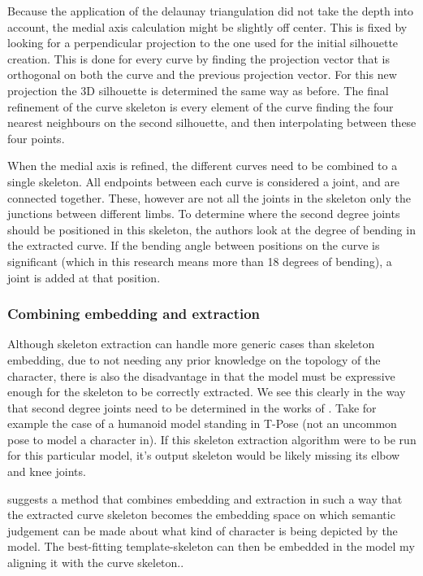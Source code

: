 \documentclass{article}
\begin{document}
Because the application of the delaunay triangulation did not take the depth
into account, the medial axis calculation might be slightly off center. This is fixed
by looking for a perpendicular projection to the one used for the initial
silhouette creation. This is done for every curve by finding the projection
vector that is orthogonal on both the curve and the previous projection vector.
For this new projection the 3D silhouette is determined the same way as before.
The final refinement of the curve skeleton is  every element of the curve
finding the four nearest neighbours on the second silhouette, and then
interpolating between these four points.

When the medial axis is refined, the different curves need to be combined to a
single skeleton. All endpoints between each curve is considered a joint, and are
connected together. These, however are not all the joints in the skeleton only
the junctions between different limbs. To determine where the second degree
joints should be positioned in this skeleton, the authors look at the degree of
bending in the extracted curve. If the bending angle between positions on the curve is 
significant (which in this research means more than 18 degrees of bending), a
joint is added at that position.

\subsubsection{Combining embedding and extraction} Although skeleton extraction
can handle more generic cases than skeleton embedding, due to not needing any
prior knowledge on the topology of the character, there is also the
disadvantage in that the model must be expressive enough for the skeleton to be
correctly  extracted. We see this clearly in the way that
second degree joints need to be determined in the works of \citep{paper2}. Take
for example the case of a humanoid model standing in T-Pose (not an uncommon
pose to model a character in). If this skeleton extraction algorithm were to be run for
this particular model, it's output skeleton would be likely missing its elbow and knee
joints. 

\citep{paper3} suggests a method that combines embedding and extraction in such
a way that the extracted curve skeleton becomes the embedding space on which semantic
judgement can be made about what kind of character is being depicted by the
model.
The best-fitting template-skeleton can then be embedded in the model my aligning it with the curve skeleton..
\end{document}
